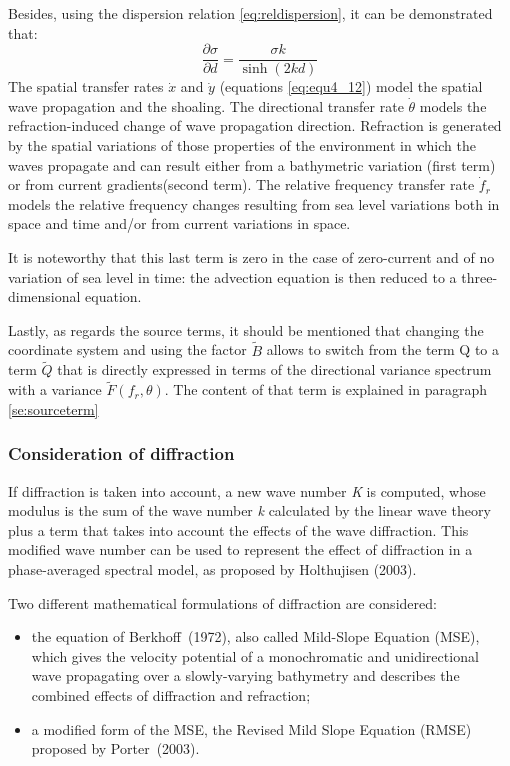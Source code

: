  Besides, using the dispersion relation \ref{eq:reldispersion}, it can be demonstrated that:
\begin{equation} \label{GrindEQ__4_14_}
\frac{\partial \sigma }{\partial d} =\frac{\sigma k}{\sinh (2kd)}
\end{equation}
The spatial transfer rates $\dot{x}$ and $\dot{y}$ (equations \ref{eq:equ4_12}) model the spatial wave propagation and the shoaling. The directional transfer rate $\dot{\theta }$ models the refraction-induced change of wave propagation direction. Refraction is generated by the spatial variations of those properties of the environment in which the waves propagate and can result either from a bathymetric variation (first term) or from current gradients(second term). The relative frequency transfer rate $\dot{f}_{r} $ models the relative frequency changes resulting from sea level variations both in space and time and/or from current variations in space.

 It is noteworthy that this last term is zero in the case of zero-current and of no variation of sea level in time: the advection equation is then reduced to a three-dimensional equation.

 Lastly, as regards the source terms, it should be mentioned that changing the coordinate system and using the factor $\tilde{B}$ allows to switch from the term Q to a term $\tilde{Q}$ that is directly expressed in terms of the directional variance spectrum with a variance $\tilde{F}(f_r, \theta)$. The content of that term is explained in paragraph \ref{se:sourceterm}


\subsubsection{ Consideration of diffraction}

 If diffraction is taken into account, a new wave number \textit{K} is computed, whose modulus is the sum of the wave number \textit{k} calculated by the linear wave theory plus a term that takes into account the effects of the wave diffraction. This modified wave number can be used to represent the effect of diffraction in a phase-averaged spectral model, as proposed by Holthujisen (2003).

 Two different mathematical formulations of diffraction are considered:

\begin{itemize}
\item  the equation of Berkhoff~(1972), also called Mild-Slope Equation (MSE), which gives the velocity potential of a monochromatic and unidirectional wave propagating over a slowly-varying bathymetry and describes the combined effects of diffraction and refraction;

\item  a modified form of the MSE, the Revised Mild Slope Equation (RMSE) proposed by Porter~(2003).
\end{itemize}


